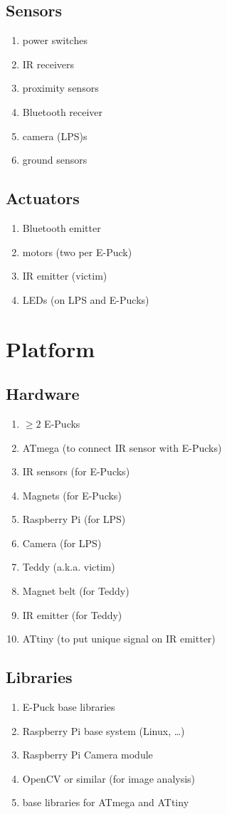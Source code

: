 \documentclass[a4paper,parskip,headheight=38pt]{scrartcl} %
\begin{document}
\subsection{Sensors}
\begin{enumerate}[label=\sensors]
\item power switches
\item IR receivers
\item proximity sensors
\item Bluetooth receiver
\item camera (LPS)s
\item ground sensors
\end{enumerate}

\subsection{Actuators}
\begin{enumerate}[label=\actuators]
\item Bluetooth emitter
\item motors (two per E-Puck)
\item IR emitter (victim)
\item LEDs (on LPS and E-Pucks)
\end{enumerate}


\section{Platform}

\subsection{Hardware}
\begin{enumerate}[label=\hardware]
\item $\ge 2$ E-Pucks
\item ATmega (to connect IR sensor with E-Pucks)
\item IR sensors (for E-Pucks)
\item Magnets (for E-Pucks)
\item Raspberry Pi (for LPS)
\item Camera (for LPS)
\item Teddy (a.k.a. victim)
\item Magnet belt (for Teddy)
\item IR emitter (for Teddy)
\item ATtiny (to put unique signal on IR emitter)
\end{enumerate}

\subsection{Libraries}
\begin{enumerate}[label=\libs]
\item E-Puck base libraries
\item Raspberry Pi base system (Linux, \ldots)
\item Raspberry Pi Camera module
\item OpenCV or similar (for image analysis)
\item base libraries for ATmega and ATtiny
\end{enumerate}
\end{document}
